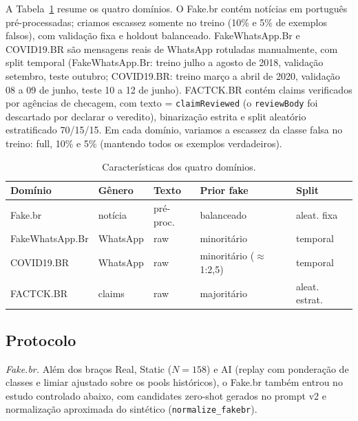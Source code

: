 \documentclass[conference]{IEEEtran}
\begin{document}
A Tabela~\ref{tab:datasets} resume os quatro dom\'inios. O Fake.br \cite{monteiro2018fakebr} cont\'em not\'icias em portugu\^es pr\'e-processadas; criamos escassez somente no treino (10\% e 5\% de exemplos falsos), com valida\c{c}\~ao fixa e holdout balanceado. FakeWhatsApp.Br \cite{cabral2021fakewhatsapp} e COVID19.BR \cite{cabral2020covid19br} s\~ao mensagens reais de WhatsApp rotuladas manualmente, com split temporal (FakeWhatsApp.Br: treino julho a agosto de 2018, valida\c{c}\~ao setembro, teste outubro; COVID19.BR: treino mar\c{c}o a abril de 2020, valida\c{c}\~ao 08 a 09 de junho, teste 10 a 12 de junho). FACTCK.BR \cite{moreno2019factckbr} cont\'em claims verificados por ag\^encias de checagem, com texto = \texttt{claimReviewed} (o \texttt{reviewBody} foi descartado por declarar o veredito), binariza\c{c}\~ao estrita e split aleat\'orio estratificado 70/15/15. Em cada dom\'inio, variamos a escassez da classe falsa no treino: full, 10\% e 5\% (mantendo todos os exemplos verdadeiros).

\begin{table}[t]
\caption{Caracter\'isticas dos quatro dom\'inios.}\label{tab:datasets}
\centering
\footnotesize
\setlength{\tabcolsep}{4pt}
\begin{tabular}{@{}lllll@{}}
\toprule
Dom\'inio & G\^enero & Texto & Prior fake & Split \\
\midrule
Fake.br & not\'icia & pr\'e-proc. & balanceado & aleat. fixa \\
FakeWhatsApp.Br & WhatsApp & raw & minorit\'ario & temporal \\
COVID19.BR & WhatsApp & raw & minorit\'ario ($\approx$1:2{,}5) & temporal \\
FACTCK.BR & claims & raw & majorit\'ario & aleat. estrat. \\
\bottomrule
\end{tabular}
\end{table}

\subsection{Protocolo}

\emph{Fake.br.} Al\'em dos bra\c{c}os Real, Static ($N{=}158$) e AI (replay com pondera\c{c}\~ao de classes e limiar ajustado sobre os pools hist\'oricos), o Fake.br tamb\'em entrou no estudo controlado abaixo, com candidates zero-shot gerados no prompt v2 e normaliza\c{c}\~ao aproximada do sint\'etico (\texttt{normalize\_fakebr}).
\end{document}
